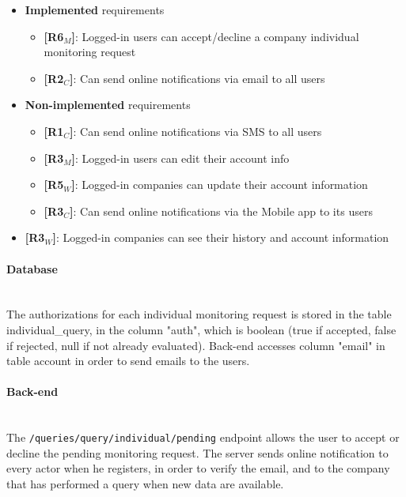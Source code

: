 \begin{itemize}
    \item \textbf{Implemented} requirements
        \begin{itemize}
      
    \item \textbf{[R6$_M$]}: Logged-in users can accept/decline a company individual monitoring request
   
    \item \textbf{[R2$_C$]}: Can send online notifications via email to all users
    

        \end{itemize}
    \item \textbf{Non-implemented} requirements
    \begin{itemize}
    
    
    \item \textbf{[R1$_C$]}: Can send online notifications via SMS to all users 
    \item \textbf{[R3$_M$]}: Logged-in users can edit their account info
    \item \textbf{[R5$_W$]}: Logged-in companies can update their account information
    \item \textbf{[R3$_C$]}: Can send online notifications via the Mobile app to its users
        \end{itemize}
    \item \textbf{[R3$_W$]}: Logged-in companies can see their history and account information
        
\end{itemize}

\paragraph{Database} \mbox{}\\
The authorizations for each individual monitoring request is stored in the table individual\_query, in the column "auth", which is boolean (true if accepted, false if rejected, null if not already evaluated).
Back-end accesses column "email" in table account in order to send emails to the users.


\paragraph{Back-end} \mbox{}\\
The \texttt{/queries/query/individual/pending} endpoint allows the user to accept or decline the pending monitoring request.
The server sends online notification to every actor when he registers, in order to verify the email, and to the company that has performed a query when new data are available.

